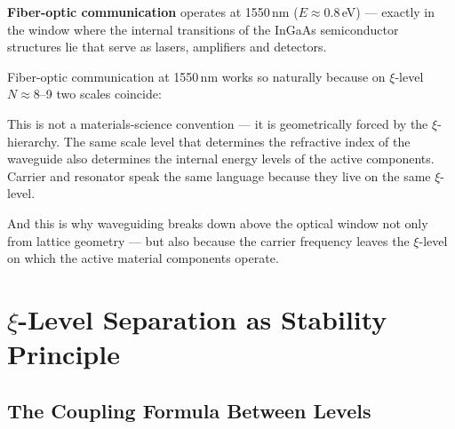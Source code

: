 \textbf{Fiber-optic communication}
operates at 1550\,nm ($E \approx 0.8$\,eV) ---
exactly in the window where the internal transitions
of the InGaAs semiconductor structures lie
that serve as lasers, amplifiers and detectors.

\begin{keyresult}
Fiber-optic communication at 1550\,nm works
so naturally because on $\xi$-level $N \approx 8$--9
two scales coincide:

\begin{center}
\end{center}

This is not a materials-science convention ---
it is geometrically forced by the $\xi$-hierarchy.
The same scale level that determines the refractive index
of the waveguide also determines
the internal energy levels of the active components.
Carrier and resonator speak the same language
because they live on the same $\xi$-level.

And this is why waveguiding breaks down above
the optical window not only from lattice geometry ---
but also because the carrier frequency
leaves the $\xi$-level on which the active
material components operate.
\end{keyresult}

\section{\texorpdfstring{$\xi$}{xi}-Level Separation as Stability Principle}
\label{sec:xi-separation}

\subsection{The Coupling Formula Between Levels}


